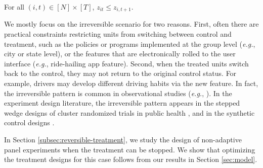    
%
\begin{assumption}\label{ass:treatment-adoption}
	For all $(i,t)\in [N]\times[T]$,
	$z_{it} \leq z_{i,t+1}$.
\end{assumption}
%
We mostly focus on the irreversible scenario for two reasons. First, often there are practical constraints
restricting units from switching between control and treatment, such as the policies or programs implemented at the group level ({\it e.g.}, city or state level), or the features that are electronically rolled to the user interface ({\it e.g.}, ride-hailing app feature). Second, when the treated units switch back to the control, they may not return to the original control status. For example, drivers may develop different driving habits via the new feature. In fact, the irreversible pattern is common in observational studies ({\it e.g.}, \cite{card1994minimum,abadie2010synthetic}).
In the experiment design literature, the irreversible pattern appears in the stepped wedge designs of cluster randomized trials in public health \citep{brown2006stepped,hussey2007design,woertman2013stepped,hemming2015stepped}, and in the synthetic control designs \citep{doudchenkodesigning2021,doudchenko2021synthetic,abadie2021synthetic}. 
%
\begin{remark}\label{rem:reversible}
In Section \ref{subsec:reversible-treatment}, we study the design of non-adaptive panel experiments when the treatment can be stopped. We show that optimizing the treatment designs for this case follows from our results in Section \ref{sec:model}.
\end{remark}


